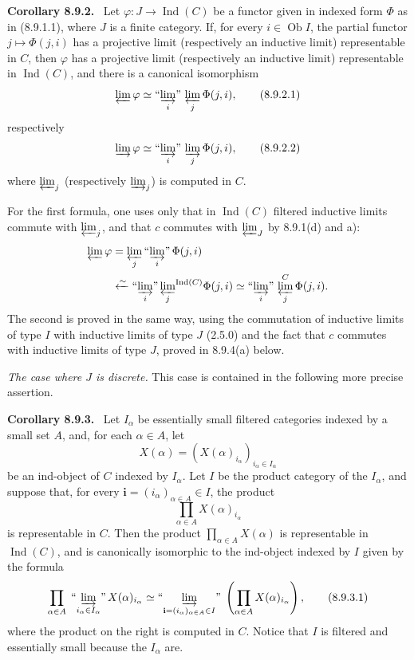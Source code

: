 \documentclass[11pt]{article}
\newcommand{\Ob}{\operatorname{Ob}}
\newcommand{\Ind}{\operatorname{Ind}}
\newcommand{\indlimI}[1]{\textrm{``}\!\varinjlim_{#1}\!\textrm{''}}
\newenvironment{statement}[1]{\par\medskip\noindent\textbf{#1.}\ }{\par\medskip}
\begin{document}
\begin{statement}{Corollary 8.9.2}
Let $\varphi:J\to\Ind(C)$ be a functor given in indexed form $\Phi$ as in (8.9.1.1), where $J$ is a finite category. If, for every $i\in\Ob I$, the partial functor $j\mapsto\Phi(j,i)$ has a projective limit (respectively an inductive limit) representable in $C$, then $\varphi$ has a projective limit (respectively an inductive limit) representable in $\Ind(C)$, and there is a canonical isomorphism
\[
 \varprojlim\varphi\simeq \indlimI{i}\,\varprojlim_j\Phi(j,i),
\tag{8.9.2.1}
\]
respectively
\[
 \varinjlim\varphi\simeq \indlimI{i}\,\varinjlim_j\Phi(j,i),
\tag{8.9.2.2}
\]
where $\varprojlim_j$ (respectively $\varinjlim_j$) is computed in $C$.
\end{statement}

For the first formula, one uses only that in $\Ind(C)$ filtered inductive limits commute with $\varprojlim_j$, and that $c$ commutes with $\varprojlim_J$ by 8.9.1(d) and a):
\[
\begin{aligned}
\varprojlim\varphi
 &= \varprojlim_j \indlimI{i}\,\Phi(j,i) \\
 &\xleftarrow{\sim} \indlimI{i}\,{\varprojlim_j}^{\Ind(C)}\Phi(j,i)
 \simeq \indlimI{i}\,\varprojlim_j^{C}\Phi(j,i).
\end{aligned}
\]
The second is proved in the same way, using the commutation of inductive limits of type $I$ with inductive limits of type $J$ (2.5.0) and the fact that $c$ commutes with inductive limits of type $J$, proved in 8.9.4(a) below.

\emph{The case where $J$ is discrete.} This case is contained in the following more precise assertion.

\begin{statement}{Corollary 8.9.3}
Let $I_\alpha$ be essentially small filtered categories indexed by a small set $A$, and, for each $\alpha\in A$, let
\[
 X(\alpha)=(X(\alpha)_{i_\alpha})_{i_\alpha\in I_\alpha}
\]
be an ind-object of $C$ indexed by $I_\alpha$. Let $I$ be the product category of the $I_\alpha$, and suppose that, for every $\mathbf i=(i_\alpha)_{\alpha\in A}\in I$, the product
\[
 \prod_{\alpha\in A}X(\alpha)_{i_\alpha}
\]
is representable in $C$. Then the product $\prod_{\alpha\in A}X(\alpha)$ is representable in $\Ind(C)$, and is canonically isomorphic to the ind-object indexed by $I$ given by the formula
\[
 \prod_{\alpha\in A}\;\indlimI{i_\alpha\in I_\alpha}\,X(\alpha)_{i_\alpha}
 \simeq
 \indlimI{\mathbf i=(i_\alpha)_{\alpha\in A}\in I}\;
 \left(\prod_{\alpha\in A}X(\alpha)_{i_\alpha}\right),
\tag{8.9.3.1}
\]
where the product on the right is computed in $C$. Notice that $I$ is filtered and essentially small because the $I_\alpha$ are.
\end{statement}
\end{document}
